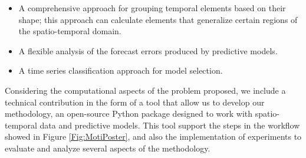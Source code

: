 \begin{itemize}
\item A comprehensive approach for grouping temporal elements based on their shape; this approach can calculate elements that generalize certain regions of the spatio-temporal domain. %




\item A flexible analysis of the forecast errors produced by predictive models. 

\item A time series classification approach for model selection. 
\end{itemize}

Considering the computational aspects of the problem proposed, we include a technical contribution in the form of a tool that allow us to develop our methodology, an open-source Python package designed to work with spatio-temporal data and predictive models. This tool support the steps in the workflow showed in Figure \ref{Fig:MotiPoster}, and also the implementation of experiments to evaluate and analyze several aspects of the methodology.

